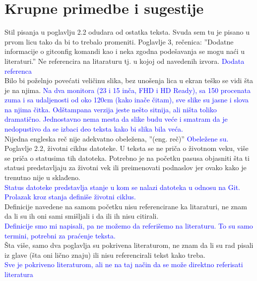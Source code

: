 \documentclass[a4paper]{report}
\newcommand{\odgovor}[1]{\textcolor{blue}{#1}}
\begin{document}
\section{Krupne primedbe i sugestije}
Stil pisanja u poglavlju 2.2 odudara od ostatka teksta. Svuda sem tu je pisano u prvom licu tako da bi to trebalo promeniti.\newline
Poglavlje 3, rečenica: ''Dodatne informacije o gitconfig komandi kao i neka zgodna podešavanja se mogu naći u literaturi.'' Ne referencira na litaraturu tj. u kojoj od navedenih izvora.\newline
\odgovor{Dodata referenca}\\
Bilo bi poželnjo povećati veličinu slika, bez unošenja lica u ekran teško se vidi šta je na njima.\newline
\odgovor{Na dva monitora (23 i 15 inča, FHD i HD Ready), sa 150 procenata zuma i sa udaljenosti od oko 120cm (kako inače čitam), sve slike su jasne i slova na njima čitka. Odštampana verzija jeste nešto sitnija, ali ništa toliko dramatično. Jednostavno nema mesta da slike budu veće i smatram da je nedopustivo da se izbaci deo teksta kako bi slika bila veća.}\\
Nijedna engleska reč nije adekvatno obeležena, ''(eng. reč)'' \newline
\odgovor{Obeležene su.}\\
Poglavlje 2.2, životni ciklus datoteke. U teksta se ne priča o životnom veku, više se priča o statusima tih datoteka. Potrebno je na početku pasusa objasniti šta ti statusi predstavljaju za životni vek ili preimenovati podnaslov jer ovako kako je trenutno nije u sklađeno.\\
\odgovor{Status datoteke predstavlja stanje u kom se nalazi datoteka u odnosu na Git. Prolazak kroz stanja definiše životni ciklus.}\\

Definicije navedene na samom početku nisu referencirane ka litaraturi, ne znam da li su ih oni sami smišljali i da ili ih nisu citirali. \\
\odgovor{Definicije smo mi napisali, pa ne možemo da referišemo na literaturu. To su samo termini, potrebni za praćenje teksta.}\\
Šta više, samo dva poglavlja su pokrivena literaturom, ne znam da li su rad pisali iz glave (šta oni lično znaju) ili nisu referencirali tekst kako treba. \\
\odgovor{Sve je pokriveno literaturom, ali ne na taj način da se može direktno referisati literatura}
\end{document}

